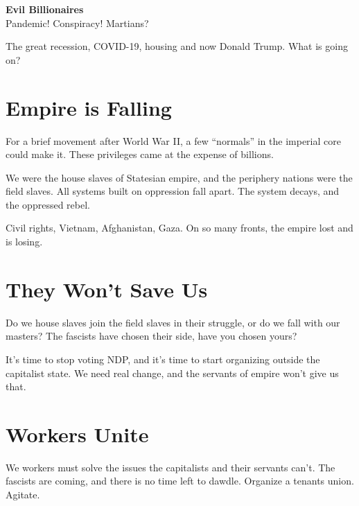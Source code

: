 \documentclass[10pt, oneside, a5paper]{article}
\author{}
\date{}
\begin{document}
{%
  \raggedright{}
  {\bfseries{}\LARGE{}Evil Billionaires}\\
  Pandemic! Conspiracy! Martians?%
}

\bigskip{}

The great recession, COVID-19, housing and now Donald Trump. What is
going on?

\section*{Empire is Falling}

For a brief movement after World War II, a few ``normals'' in the
imperial core could make it. These privileges came at the expense of
billions.

We were the house slaves of Statesian empire, and the periphery
nations were the field slaves. All systems built on oppression fall
apart. The system decays, and the oppressed rebel.

Civil rights, Vietnam, Afghanistan, Gaza. On so many fronts, the
empire lost and is losing.

\section*{They Won't Save Us}

Do we house slaves join the field slaves in their struggle, or do we
fall with our masters?  The fascists have chosen their side, have you
chosen yours?

It's time to stop voting {NDP}, and it's time to start organizing
outside the capitalist state.  We need real change, and the servants
of empire won't give us that.

\section*{Workers Unite}

We workers must solve the issues the capitalists and their servants
can't. The fascists are coming, and there is no time left to
dawdle. Organize a tenants union. Agitate.

\end{document}
